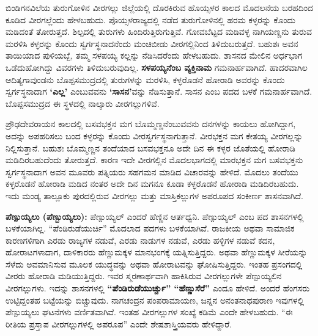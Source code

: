 ಬಿಂಡಿಗನವಿಲೆಯ ತುರುಗೋಳಿನ ವೀರಗಲ್ಲು ಜಿಲ್ಲೆಯಲ್ಲಿ ದೊರಕಿರುವ ಹೊಯ್ಸಳರ ಕಾಲದ ಮೊದಲನೆಯ ಬರಹದಿಂದ ಕೂಡಿದ ವೀರಗಲ್ಲೆಂದು ಹೇಳಬಹುದು. ಪೊಯ್ಸಳರಾಜ್ಯದಲ್ಲಿ ನಡೆದ ತುರುಗೋಳಿನಲ್ಲಿ ಹರಮ ಕಳ್ಳರನ್ನು ಕೊಂದು ಮಡಿದಂತೆ ತೋರುತ್ತದೆ. ಶಿಲ್ಪದಲ್ಲಿ ತುರುಗಳು ಹಿಂದಿರುತ್ತಿರುಗುತ್ತಿವೆ. ಗೋವಬೆಟ್ಟದ ಮಡಿವಳ್ಳ ನಾಗಿಯಣ್ಣನು ತುರುವ ಮರಳಿಸಿ ಕಳ್ಳರನ್ನು ಕೊಂದು ಸ್ವರ್ಗಸ್ಥನಾದನೆಂದು ಮಂಚಿಬೀಡು ವೀರಗಲ್ಲಿನಿಂದ ತಿಳಿದುಬರುತ್ತದೆ. ಬಹುಶಃ ಅವನ ತಾಯಿಯಾದ ಪುಳಿಯಬ್ಬೆ, ತಮ್ಮ ಸಳಪಯ್ಯ ಕಲ್ಲನ್ನು ನೆಡಿಸಿದರೆಂದು ಹೇಳಬಹುದು. ಶಾಸನದ ಮೇಲಿನ ಅರ್ಧಭಾಗ ಒಡೆದುಹೋಗಿದ್ದು ವಿವರಗಳು ತಿಳಿದುಬರುವುದಿಲ್ಲ. \textbf{ಸಳಪಯ್ಯನೆಂಬ ವ್ಯಕ್ತಿನಾಮ} ಗಮನಾರ್ಹವಾಗಿದೆ. ಹಾದರವಾಗಿಲ ಆದಿತ್ಯಗಾವುಂಡನು ಬೊಪ್ಪಸಮುದ್ರದಲ್ಲಿ ತುರುಗಳನ್ನು ಮರಳಿಸಿ, ಕಳ್ಳರೊಡನೆ ಹೋರಾಡಿ ಅವರನ್ನು ಕೊಂದು ಸ್ವರ್ಗಸ್ಥನಾದಾಗ \textbf{‘ಎಲ್ಲ’} ಎಂಬುವವನು \textbf{‘ಸಾಸನ’}ವನ್ನು ನೆಡಿಸುತ್ತಾನೆ. ಸಾಸನ ಎಂಬ ಪದದ ಬಳಕೆ ಗಮನಾರ್ಹವಾಗಿದೆ. ಬೊಪ್ಪಸಮುದ್ರದ ಈ ಸ್ಥಳದಲ್ಲಿ ನಾಲ್ಕಾರು ವೀರಗಲ್ಲುಗಳಿವೆ.

ಪ್ರೌಢದೇವರಾಯನ ಕಾಲದಲ್ಲಿ ಬಸವಭಕ್ತನ ಮಗ ಬೊಮ್ಮಣ್ಣನೆಂಬುವವನು ದನಗಳನ್ನು ಕಾಯಲು ಹೋಗಿದ್ದಾಗ, ಅದನ್ನು ಅಪಹರಿಸಲು ಬಂದ ಕಳ್ಳರನ್ನು ಕೊಂದು ವೀರಸ್ವರ್ಗಸ್ಥನಾಗುತ್ತಾನೆ. ವೀರಭಕ್ತನ ಮಗ ಕೇತಯ್ಯ ವೀರಗಲ್ಲನ್ನು ನಿಲ್ಲಿಸುತ್ತಾನೆ. ಬಹುಶಃ ಬೊಮ್ಮಣ್ಣನ ತಂದೆಯಾದ ಬಸವಭಕ್ತನೂ ಅದೇ ದಿನ ಈ ಕಳ್ಳರ ಜೊತೆಯಲ್ಲಿ ಹೋರಾಡಿ ಮಡಿದಿರಬಹುದೆಂದು ತೋರುತ್ತದೆ. ಕಾರಣ ಇದೇ ವೀರಗಲ್ಲಿನ ಮೊದಲಭಾಗದಲ್ಲಿ ಮಾರಭಕ್ತನ ಮಗ ಬಸವಭಕ್ತನು ಸ್ವರ್ಗಸ್ಥನಾದಾಗ ಅವನ ಮೂವರು ಪತ್ನಿಯರು ಸಹಗಮನ ಮಾಡಿದ ವಿಚಾರವನ್ನು ಹೇಳಿದೆ. ಮೊದಲು ತಂದೆಯು ಕಳ್ಳರೊಡನೆ ಹೋರಾಡಿ ಮಡಿದ ನಂತರ ಅದೇ ದಿನ ಮಗನೂ ಕೂಡಾ ಕಳ್ಳರೊಡನೆ ಹೋರಾಡಿ ಮಡಿದಿರಬಹುದು. ಇದು ಮಂಡ್ಯ ತಾಲ್ಲೂಕು ಪುರದಲ್ಲಿರುವ ವೀರಗಲ್ಲು ಮತ್ತು ಮಾಸ್ತಿಕಲ್ಲುಗಳ ಅಪರೂಪದ ಸಂಕೀರ್ಣ ಶಾಸನವಾಗಿದೆ.

\textbf{ಪೆಣ್ಪುಯ್ಯಲು (ಪೆಣ್ಬುಯ್ಯಲು): } ಪೆಣ್ಪುಯ್ಯಲ್​ ಎಂದರೆ ಹೆಣ್ಣಿನ ಆರ್ತಧ್ವನಿ. ಪೆಣ್ಪುಯ್ಯಲ್​ ಎಂಬ ಪದ ಶಾಸನಗಳಲ್ಲಿ ಬಳಕೆಯಾಗಿಲ್ಲ. “ಪೆಂಡಿರುಡೆಯುರ್ಚಿ” ಮೊದಲಾದ ಪದಗಳು ಬಳಕೆಯಾಗಿವೆ. ರಾಜಕೀಯ ಅಥವಾ ಸಾಮಾಜಿಕ ಕಾರಣಗಳಿಗಾಗಿ ಎರಡು ರಾಜ್ಯಗಳ ನಡುವೆ, ಎರಡು ನಾಡುಗಳ ನಡುವೆ, ಎರಡು ಹಳ್ಳಿಗಳ ನಡುವೆ ಕದನ, ಹೋರಾಟಗಳಾದಾಗ, ದಾಳಿಕಾರರು ಹೆಣ್ಣುಮಕ್ಕಳ ಮಾನಭಂಗಕ್ಕೆ ಯತ್ನಿಸುತ್ತಿದ್ದರು. ಅಥವಾ ಹೆಣ್ಣುಮಕ್ಕಳ ಸೀರೆಯನ್ನು ಸೆಳೆದು ಅವಮಾನಿಸುವ ಮೂಲಕ ಯುದ್ಧವನ್ನು ಅಥವಾ ಹೋರಾಟವನ್ನು ಘೋಷಿಸುತ್ತಿದ್ದರು. ಇಂತಹ ಪ್ರಸಂಗದಲ್ಲಿ ವೀರರು ಹೋರಾಡಿ ಮಡಿಯುತ್ತಿದ್ದರು. ಇವರ ಸ್ಮರಣಾರ್ಥವಾಗಿ ಹಾಕಿಸಿರುವ ವೀರಗಲ್ಲುಗಳೇ ಪೆಣ್ಪುಯ್ಯಲಿನ ವೀರಗಲ್ಲುಗಳು. ಇದನ್ನು ಶಾಸನಗಳಲ್ಲಿ \textbf{“ಪೆಂಡಿರುಡೆಯುರ್ಚ್ಚು” “ಹೆಣ್ಣುಸೆರೆ”} ಎಂದೂ ಹೇಳಿದೆ. ಅಂದರೆ ಹೆಂಗಸರು ಉಟ್ಟಿದ್ದಂತಹ ಬಟ್ಟೆಯನ್ನು ಬಿಚ್ಚುವುದು. ನಾಗಚಂದ್ರನ ಪಂಪರಾಮಾಯಣ, ಜನ್ನನ ಅನಂತನಾಥಪುರಾಣ ಇವುಗಳಲ್ಲಿ ಪೆಣ್ಪುಯ್ಯಲು ಘಟನೆಗಳು ವರ್ಣಿತವಾಗಿವೆ. ಇಂತಹ ವೀರಗಲ್ಲುಗಳ ಸಂಖ್ಯೆ ಕಡಿಮೆ ಎಂದೇ ಹೇಳಬಹುದು. “ಈ ರೀತಿಯ ಪ್ರಸ್ತಾಪ ವೀರಗಲ್ಲುಗಳಲ್ಲಿ ಅಪರೂಪ” ಎಂದೇ ಶೇಷಶಾಸ್ತ್ರಿಯವರು ಹೇಳಿದ್ದಾರೆ.

